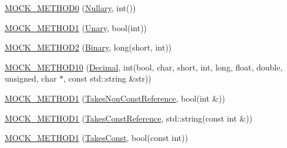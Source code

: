\begin{DoxyCompactItemize}
\item 
\mbox{\hyperlink{classtesting_1_1gmock__generated__function__mockers__test_1_1_mock_foo_a25b99ec3b994318b7ecb0578da113136}{M\+O\+C\+K\+\_\+\+M\+E\+T\+H\+O\+D0}} (\mbox{\hyperlink{classtesting_1_1gmock__generated__function__mockers__test_1_1_foo_interface_a633e753eafa7f82dde22ecf9492f341c}{Nullary}}, int())
\item 
\mbox{\hyperlink{classtesting_1_1gmock__generated__function__mockers__test_1_1_mock_foo_a9f9ce709a5b13e319eeb348e6eae3d18}{M\+O\+C\+K\+\_\+\+M\+E\+T\+H\+O\+D1}} (\mbox{\hyperlink{classtesting_1_1gmock__generated__function__mockers__test_1_1_foo_interface_ae0885ac29bc4a3f180f6573d8b1a341e}{Unary}}, bool(int))
\item 
\mbox{\hyperlink{classtesting_1_1gmock__generated__function__mockers__test_1_1_mock_foo_a50f8c94d6fab258d49e1d4a15ea7a7af}{M\+O\+C\+K\+\_\+\+M\+E\+T\+H\+O\+D2}} (\mbox{\hyperlink{classtesting_1_1gmock__generated__function__mockers__test_1_1_foo_interface_a59ea28b711ece054ce9d57c2dc574ba0}{Binary}}, long(short, int))
\item 
\mbox{\hyperlink{classtesting_1_1gmock__generated__function__mockers__test_1_1_mock_foo_ab0a37a844eb43c36ca45cff5274bd9e9}{M\+O\+C\+K\+\_\+\+M\+E\+T\+H\+O\+D10}} (\mbox{\hyperlink{classtesting_1_1gmock__generated__function__mockers__test_1_1_foo_interface_a5a389017205848c7b7055c071cca0c6d}{Decimal}}, int(bool, char, short, int, long, float, double, unsigned, char $\ast$, const std\+::string \&str))
\item 
\mbox{\hyperlink{classtesting_1_1gmock__generated__function__mockers__test_1_1_mock_foo_a785cbef820189a974170cea52b0d97d9}{M\+O\+C\+K\+\_\+\+M\+E\+T\+H\+O\+D1}} (\mbox{\hyperlink{classtesting_1_1gmock__generated__function__mockers__test_1_1_foo_interface_a694354adfffcee58093298bc12182ff5}{Takes\+Non\+Const\+Reference}}, bool(int \&))
\item 
\mbox{\hyperlink{classtesting_1_1gmock__generated__function__mockers__test_1_1_mock_foo_a94d9e3801000de6dec4b4394a12a9349}{M\+O\+C\+K\+\_\+\+M\+E\+T\+H\+O\+D1}} (\mbox{\hyperlink{classtesting_1_1gmock__generated__function__mockers__test_1_1_foo_interface_aae85be7a3d1b53625fbeeac4694292d3}{Takes\+Const\+Reference}}, std\+::string(const int \&))
\item 
\mbox{\hyperlink{classtesting_1_1gmock__generated__function__mockers__test_1_1_mock_foo_a7b548776b156454bcddecaca6294c52f}{M\+O\+C\+K\+\_\+\+M\+E\+T\+H\+O\+D1}} (\mbox{\hyperlink{classtesting_1_1gmock__generated__function__mockers__test_1_1_foo_interface_a8c53e87edf0b9da878e5259f02b7f5dc}{Takes\+Const}}, bool(const int))

\end{DoxyCompactItemize}
